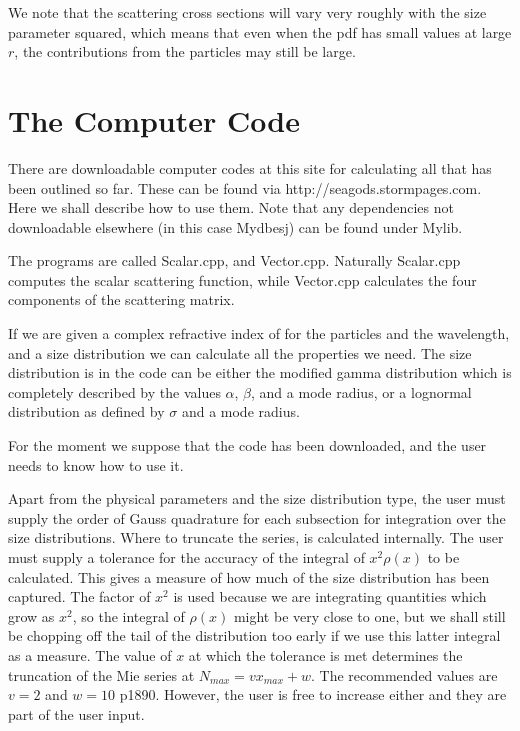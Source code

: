 \documentclass[12pt]{article}
\begin{document}
\begin{flushleft}
We note that the scattering cross sections will vary very roughly with
the size parameter squared, which means that even when the pdf has small
values at large $r$, the contributions from the particles may still be large.

\section{The Computer Code}

There are downloadable computer codes at this site for calculating 
all that has been outlined so far. These can be found via
http://seagods.stormpages.com. Here we shall describe how to
use them. Note that any dependencies not downloadable elsewhere 
(in this case Mydbesj) can be found under Mylib.

The programs are called Scalar.cpp, and Vector.cpp. Naturally Scalar.cpp
computes the scalar scattering function, while Vector.cpp calculates the four
components of the scattering matrix.

If we are given a complex refractive index of for the particles
 and the wavelength, and a size distribution we can calculate 
all the properties we need.
The size distribution is in the code can be either the  modified gamma 
distribution which is
completely described by the values  $\alpha$, $\beta$, and a mode radius, or
a lognormal distribution as defined by $\sigma$ and a mode radius.
 

For the moment we suppose that the code has been downloaded, and
 the user needs
to know how to use it.

Apart from the physical parameters and the size distribution type, the user
must supply the order of Gauss quadrature for each subsection for integration
over the size distributions.
Where to truncate the series, is calculated internally. The user must supply a 
tolerance for the accuracy of the integral of $x^2 \rho(x)$ to be calculated.
This gives a measure of how much of the size distribution has been captured.
The factor of $x^2$ is used because we are integrating quantities which grow as 
$x^2$, so the integral of $\rho(x)$ might be very close to one, but we shall still
be chopping off the tail of the distribution too early if we use this latter 
integral  as a measure. The value of $x$ at which the tolerance is met determines
the truncation of the Mie series at $N_{max}=v x_{max}+w$. The recommended values
are $v=2$ and $w=10$ \cite{Dave1:Miebib} p1890. However, the user is free to increase
 either and they are part of the user input.


\end{flushleft}
\end{document}
